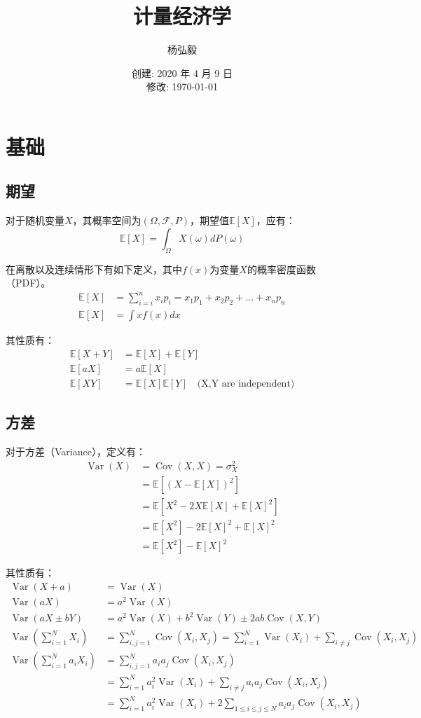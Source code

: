 \documentclass[11pt]{article}
\title{计量经济学}
\author{杨弘毅}
\date{创建: 2020 年 4 月 9 日 \\修改: \today}
\newcommand{\E}{\mathbb{E}}
\DeclareMathOperator{\Var}{Var}
\DeclareMathOperator{\Cov}{Cov}
\begin{document}
\maketitle

\tableofcontents

\section{基础}

\subsection{期望}

对于随机变量$X$，其概率空间为$(\Omega,\mathcal{F},P)$，期望值$\E[X]$，应有：
\begin{equation*}
    \E[X] = \int_{\Omega} X(\omega) dP(\omega)
\end{equation*}

在离散以及连续情形下有如下定义，其中$f(x)$为变量$X$的概率密度函数（PDF）。
\begin{align*}
    \E[X] &= \sum_{i=i}^n x_i p_i =x_1 p_1 + x_2 p_2 + \dots + x_n p_n \\
    \E[X] &= \int x f(x) dx
\end{align*}

其性质有：
\begin{align*}
    \E[X+Y] &= \E[X] + \E[Y] \\
    \E[aX] &= a \E[X] \\
    \E[XY] &= \E[X]\E[Y] \quad \text{(X,Y are independent)}
\end{align*}


\subsection{方差}

对于方差（Variance），定义有：
\begin{align*}
    \Var(X) &= \Cov(X,X) = \sigma_X^2\\ 
    &= \E[(X-\E[X])^2] \\
    &= \E[X^2 - 2X\E[X] + \E[X]^2] \\
    &= \E[X^2] - 2\E[X]^2 + \E[X]^2 \\
    &= \E[X^2] - \E[X]^2
\end{align*}

其性质有：
\begin{align*}
    \Var(X + a) &= \Var(X) \\
    \Var(aX) &= a^2\Var(X) \\
    \Var(aX \pm bY) &= a^2\Var(X) + b^2\Var(Y) \pm 2ab \Cov(X,Y) \\
    \Var(\sum_{i=1}^{N} X_i) &= \sum_{i,j=1}^{N}\Cov(X_i,X_j) = \sum_{i=1}^{N}\Var(X_i) + \sum_{i \neq j}\Cov(X_i,X_j) \\
    \Var(\sum_{i=1}^{N} a_i X_i) &= \sum_{i,j=1}^{N}a_i a_j\Cov(X_i,X_j) \\
    &= \sum_{i=1}^{N}a_i^2\Var(X_i) + \sum_{i \neq j} a_i a_j \Cov(X_i,X_j) \\
    &= \sum_{i=1}^{N}a_i^2\Var(X_i) + 2\sum_{1 \leq i \leq j \leq N} a_i a_j \Cov(X_i,X_j)
\end{align*}
\end{document}
